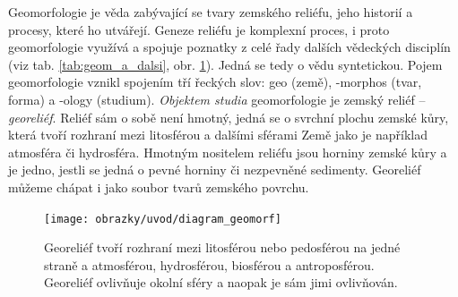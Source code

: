 Geomorfologie je věda zabývající se tvary zemského reliéfu, jeho historií a procesy, které ho utvářejí. Geneze reliéfu je komplexní proces, i proto geomorfologie využívá a spojuje poznatky z celé řady dalších vědeckých disciplín (viz tab. \ref{tab:geom_a_dalsi}, obr. \ref{fig:diagramgeomorf}). Jedná se tedy o vědu syntetickou. Pojem geomorfologie vznikl spojením tří řeckých slov: geo (země), -morphos (tvar, forma) a -ology (studium).
\emph{Objektem studia} geomorfologie je zemský reliéf -- \emph{georeliéf}. Reliéf sám o sobě není hmotný, jedná se o svrchní plochu zemské kůry, která tvoří rozhraní mezi litosférou a dalšími sférami Země jako je například atmosféra či hydrosféra. Hmotným nositelem reliéfu jsou horniny zemské kůry a je jedno, jestli se jedná o pevné horniny či nezpevněné sedimenty. Georeliéf můžeme chápat i jako soubor tvarů zemského povrchu.

\begin{figure}[h]
	\centering
	\texttt{[image: obrazky/uvod/diagram\_geomorf]}
	\caption{Georeliéf tvoří rozhraní mezi litosférou nebo pedosférou na jedné straně a atmosférou, hydrosférou, biosférou a antroposférou. Georeliéf ovlivňuje okolní sféry a naopak je sám jimi ovlivňován.}
	\label{fig:diagramgeomorf}
\end{figure}


